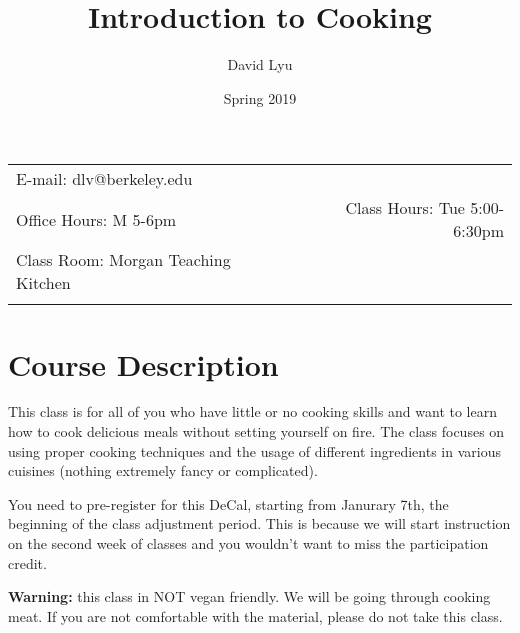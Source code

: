 \documentclass[11pt]{article}
\title{Introduction to Cooking}
\author{David Lyu}
\date{Spring 2019}
\newcommand{\blankline}{\quad\pagebreak[2]}
\begin{document}
\maketitle

\blankline

\begin{tabular*}{.93\textwidth}{@{\extracolsep{\fill}}lr}


E-mail: dlv@berkeley.edu %
\\

 Office Hours: M 5-6pm  &  Class Hours: Tue 5:00-6:30pm \\

Class Room: Morgan Teaching Kitchen \\
& \\
\hline
\end{tabular*}

\vspace{5 mm}


\section*{Course Description}

This class is for all of you who have little or no cooking skills and want to learn how to cook delicious meals without setting yourself on fire. The class focuses on using proper cooking techniques and the usage of different ingredients in various cuisines (nothing extremely fancy or complicated). 

\bigskip

\noindent You need to pre-register for this DeCal, starting from Janurary 7th, the beginning of the class adjustment period. This is because we will start instruction on the second week of classes and you wouldn't want to miss the participation credit.

\bigskip 

\noindent \textbf{Warning:} this class in NOT vegan friendly. We will be going through cooking meat. If you are not comfortable with the material, please do not take this class. 

\end{document}
